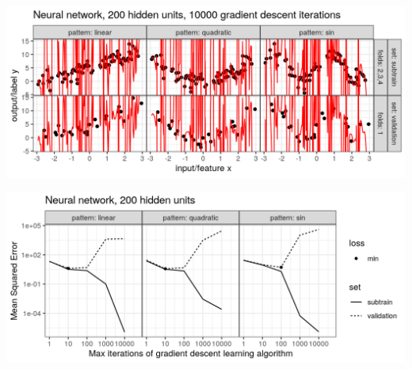 \begin{frame}
  \includegraphics[width=\textwidth]{figure-overfitting-pred-units=200-maxit=10000.png}
\end{frame}


\begin{frame}
  \includegraphics[width=\textwidth]{figure-overfitting-data-loss-200.png}
\end{frame}

